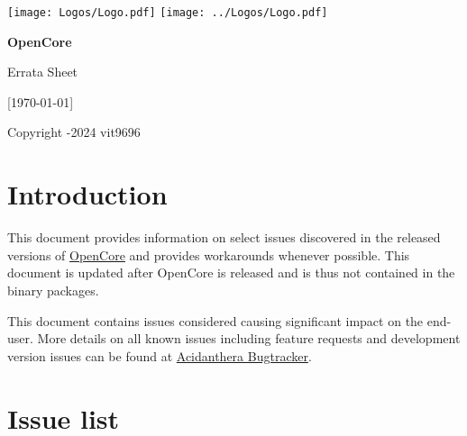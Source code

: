 \documentclass[]{article}
\begin{document}
\begin{titlepage}
   \begin{center}
       \vspace*{2.0in}

       \Huge

         {\texttt{[image: Logos/Logo.pdf]}}
         {\texttt{[image: ../Logos/Logo.pdf]}}

       \sffamily

       \textbf{OpenCore}

       \vspace{0.2in}

       Errata Sheet

       \vspace{0.2in}

        {[}\today{]}

       \normalsize

       \vfill

       \rmfamily

       Copyright -2024 vit9696

   \end{center}
\end{titlepage}

\section{Introduction}\label{introduction}

This document provides information on select issues discovered in the released
versions of \href{https://github.com/acidanthera/OpenCorePkg}{OpenCore}
and provides workarounds whenever possible. This document is updated
after OpenCore is released and is thus not contained in the binary packages.

This document contains issues considered causing significant impact on the end-user.
More details on all known issues including feature requests and development version issues
can be found at \href{https://github.com/acidanthera/bugtracker}{Acidanthera Bugtracker}.

\section{Issue list}\label{issuelist}
\end{document}
